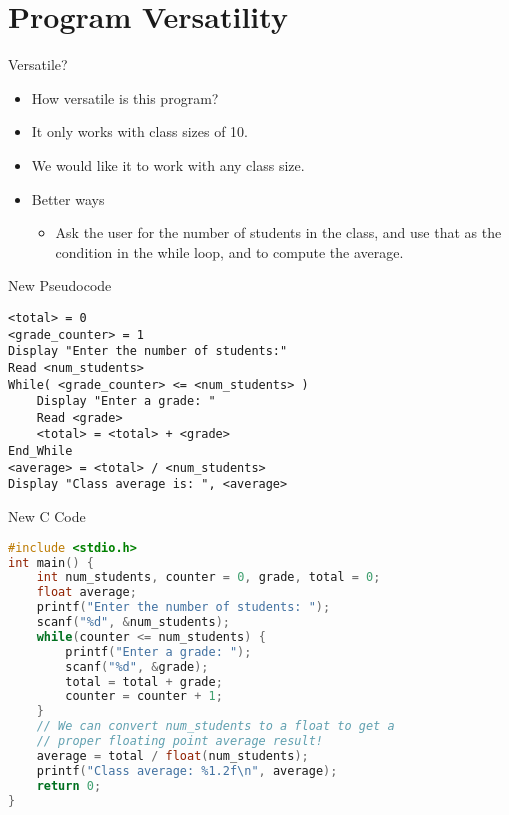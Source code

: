 \documentclass[graphics]{beamer}
\begin{document}
\section{Program Versatility}
\begin{frame}{Versatile?}
    \begin{itemize}
        \item How versatile is this program?
        \item It only works with class sizes of 10.
        \item We would like it to work with any class size.
        \item Better ways
        \begin{itemize}
            \item Ask the user for the number of students in the class, and use that as the condition in the while loop, and to compute the average.
        \end{itemize}
    \end{itemize}
\end{frame}

\begin{frame}[fragile]{New Pseudocode}
\begin{verbatim}
<total> = 0
<grade_counter> = 1
Display "Enter the number of students:"
Read <num_students>
While( <grade_counter> <= <num_students> )
    Display "Enter a grade: "
    Read <grade>
    <total> = <total> + <grade>
End_While
<average> = <total> / <num_students>
Display "Class average is: ", <average>
\end{verbatim}
\end{frame}

\begin{frame}[fragile]{New C Code}
\begin{lstlisting}[language=C,basicstyle=\footnotesize,keywordstyle=\color{blue},commentstyle=\color{green},showstringspaces=false,stringstyle=\color{red}]
#include <stdio.h>
int main() {
    int num_students, counter = 0, grade, total = 0;
    float average;
    printf("Enter the number of students: ");
    scanf("%d", &num_students);
    while(counter <= num_students) {
        printf("Enter a grade: ");
        scanf("%d", &grade);
        total = total + grade;
        counter = counter + 1;
    }
    // We can convert num_students to a float to get a
    // proper floating point average result!
    average = total / float(num_students);
    printf("Class average: %1.2f\n", average);
    return 0;
}
\end{lstlisting}
\end{frame}
\end{document}
